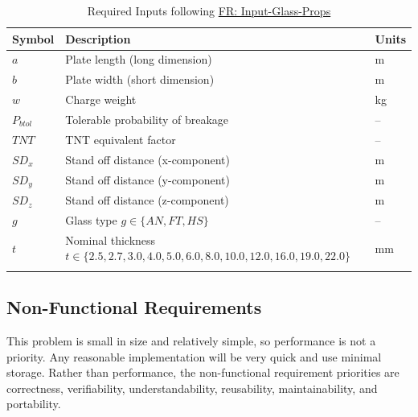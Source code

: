 \documentclass[12pt]{article}
\begin{document}
\begin{longtabu}{l X[l] l}
\toprule
Symbol & Description & Units
\\
\midrule
$a$ & Plate length (long dimension) & m
\\
$b$ & Plate width (short dimension) & m
\\
$w$ & Charge weight & kg
\\
${P_{btol}}$ & Tolerable probability of breakage & --
\\
$TNT$ & TNT equivalent factor & --
\\
${SD_{x}}$ & Stand off distance (x-component) & m
\\
${SD_{y}}$ & Stand off distance (y-component) & m
\\
${SD_{z}}$ & Stand off distance (z-component) & m
\\
$g$ & Glass type $g\in{}\{AN,FT,HS\}$ & --
\\
$t$ & Nominal thickness $t\in{}\{2.5,2.7,3.0,4.0,5.0,6.0,8.0,10.0,12.0,16.0,19.0,22.0\}$ & mm
\\
\bottomrule
\caption{Required Inputs following \hyperref[inputGlassProps]{FR: Input-Glass-Props}}
\label{Table:InputGlassPropsReqInputs}
\end{longtabu}
\subsection{Non-Functional Requirements}
\label{Sec:NFRs}
This problem is small in size and relatively simple, so performance is not a priority. Any reasonable implementation will be very quick and use minimal storage. Rather than performance, the non-functional requirement priorities are correctness, verifiability, understandability, reusability, maintainability, and portability.
\end{document}
